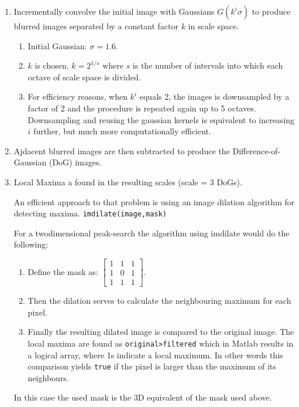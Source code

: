 \documentclass[10pt,a4paper]{scrartcl}
\begin{document}
\begin{multicols*}{2}
\begin{enumerate}
\item Incrementally convolve the initial image with Gaussians $G(k^i\sigma)$ to produce blurred images separated by a constant factor $k$ in scale space.
\begin{enumerate}
\item Initial Gaussian: $\sigma = 1.6$.
\item $k$ is chosen. $k=2^{1/s}$ where $s$ is the number of intervals into which each octave of scale space is divided.
\item For efficiency reasons, when $k^i$ equals 2, the images is downsampled by a factor of 2 and the procedure is repeated again up to 5 octaves. Downsampling and reusing the gaussian kernels is equivalent to increasing $i$ further, but much more computationally efficient.
\end{enumerate}
\item Ajdacent blurred images are then subtracted to produce the Difference-of-Gaussian (DoG) images.
\item Local Maxima a found in the resulting scales (scale = 3 DoGs).


An efficient approach to that problem is using an image dilation algorithm for detecting maxima. \verb+imdilate(image,mask)+

For a twodimensional peak-search the algorithm using imdilate would do the following:

\begin{enumerate}
\item Define the mask as: $\begin{bmatrix}
1&1&1\\1&0&1\\1&1&1
\end{bmatrix}$.
\item Then the dilation serves to calculate the neighbouring maximum for each pixel.
\item Finally the resulting dilated image is compared to the original image. The local maxima are found as \verb+original>filtered+ which in Matlab results in a logical array, where 1s indicate a local maximum. In other words this comparison yields \verb+true+ if the pixel is larger than the maximum of its neighbours.
\end{enumerate}

In this case the used mask is the 3D equivalent of the mask used above.
\end{enumerate}


\end{multicols*}
\end{document}
